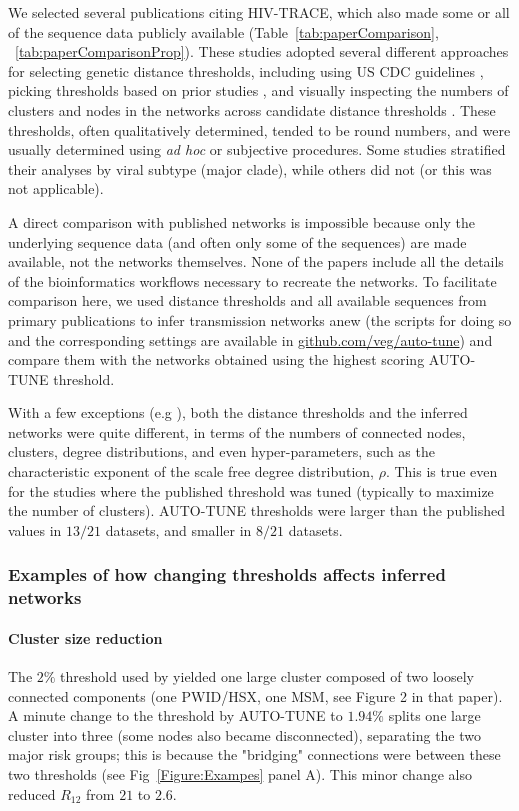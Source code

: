 \documentclass[utf8]{FrontiersinHarvard} %
\begin{document}
We selected several publications citing HIV-TRACE, which also made  some or all
of the sequence data publicly available (Table~\ref{tab:paperComparison},
~\ref{tab:paperComparisonProp}). These studies adopted several different
approaches for selecting genetic distance thresholds, including using US CDC
guidelines \citep{yan_central_2020}, picking thresholds based on prior studies
\citep{sivay_hiv-1_2018}, and visually inspecting the numbers of clusters and
nodes in the networks across candidate distance thresholds
\citep{liu_dynamics_2020}. These thresholds, often qualitatively determined,
tended to be round numbers, and were usually determined using {\it ad hoc} or
subjective procedures. Some studies stratified their analyses by viral subtype
(major clade), while others did not (or this was not applicable).

A direct comparison with published networks is impossible because only the
underlying sequence data (and often only some of the sequences) are made
available, not the networks themselves. None of the papers include all the
details of the bioinformatics workflows necessary to recreate the networks. To
facilitate comparison here, we used distance thresholds and all available
sequences from primary publications to infer transmission networks anew (the
scripts for doing so and the corresponding settings are available in
\url{github.com/veg/auto-tune}) and compare them with the networks obtained
using the highest scoring AUTO-TUNE threshold.

With a few exceptions (e.g \cite{dalai_combining_2018,sivay_hiv-1_2018}), both
the distance thresholds and the inferred networks were quite different, in
terms of the numbers of connected nodes, clusters, degree distributions, and
even hyper-parameters, such as the characteristic exponent of the scale free
degree distribution, $\rho$. This is true even for the studies where the
published threshold was tuned (typically to maximize the number of clusters).
AUTO-TUNE thresholds were larger than the published values in $13/21$ datasets,
and smaller in $8/21$ datasets. 

\subsubsection{Examples of how changing thresholds affects inferred networks}

\paragraph{Cluster size reduction} The $2\%$ threshold used by
\citet{dalai_combining_2018} yielded one large cluster composed of two loosely
connected components (one PWID/HSX, one MSM, see Figure 2 in that paper). A
minute change to the threshold by AUTO-TUNE to $1.94\%$ splits one large
cluster into three (some nodes also became disconnected), separating the two
major risk groups; this is because the "bridging" connections were between
these two thresholds (see Fig~\ref{Figure:Exampes} panel A). This minor change
also reduced $R_{12}$ from $21$ to $2.6$.
\end{document}

